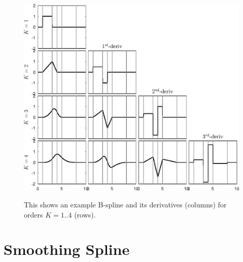 \documentclass[10pt]{article}
\begin{document}
\begin{figure}[t]
  \noindent\includegraphics[width=39pc,angle=0]{bsplines}\\
  \caption{This shows an example B-spline and its derivatives (columns) for orders $K=1..4$ (rows).}
  \label{bsplines}
\end{figure}

%
\section{Smoothing Spline}
%
\end{document}
